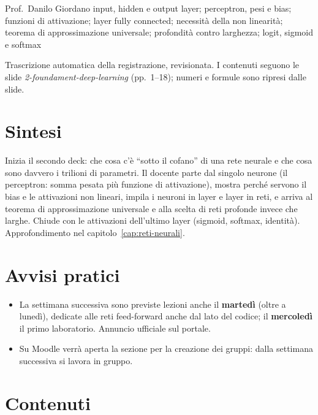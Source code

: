   {Prof.~Danilo Giordano}
  {input, hidden e output layer; perceptron, pesi e bias; funzioni di attivazione;
   layer fully connected; necessità della non linearità; teorema di approssimazione universale;
   profondità contro larghezza; logit, sigmoid e softmax}
\label{lez:2026-09-28}

\begin{nota}[Fonte]
Trascrizione automatica della registrazione, revisionata. I contenuti seguono le slide
\emph{2-foundament-deep-learning} (pp.~1--18); numeri e formule sono ripresi dalle slide.
\end{nota}

\section{Sintesi}
Inizia il secondo deck: che cosa c'è ``sotto il cofano'' di una rete neurale e che cosa sono
davvero i trilioni di parametri. Il docente parte dal singolo neurone (il perceptron: somma pesata più
funzione di attivazione), mostra perché servono il bias e le attivazioni non lineari, impila i
neuroni in layer e layer in reti, e arriva al teorema di approssimazione universale e alla scelta di
reti profonde invece che larghe. Chiude con le attivazioni dell'ultimo layer (sigmoid, softmax,
identità). Approfondimento nel capitolo~\ref{cap:reti-neurali}.

\section{Avvisi pratici}
\begin{itemize}
  \item La settimana successiva sono previste lezioni anche il \textbf{martedì} (oltre a lunedì),
    dedicate alle reti feed-forward anche dal lato del codice; il \textbf{mercoledì} il primo
    laboratorio. Annuncio ufficiale sul portale.
  \item Su Moodle verrà aperta la sezione per la creazione dei gruppi: dalla settimana successiva si
    lavora in gruppo.
\end{itemize}

\section{Contenuti}

